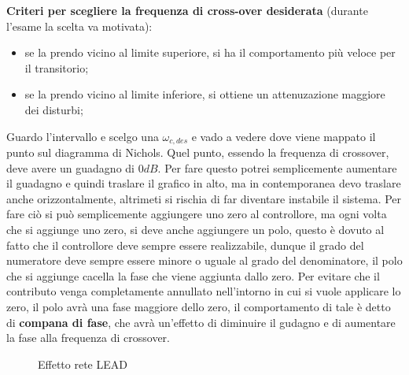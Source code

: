 \documentclass[12pt]{article}
\begin{document}
\textbf{Criteri per scegliere la frequenza di cross-over desiderata} (durante l'esame la scelta va motivata):
\begin{itemize}
    \item se la prendo vicino al limite superiore, si ha il comportamento pi\`u veloce per il transitorio;
    \item se la prendo vicino al limite inferiore, si ottiene un attenuzazione maggiore dei disturbi;
\end{itemize}


Guardo l'intervallo e scelgo una $\omega _{c,des}$ e vado a vedere dove viene mappato il punto sul diagramma di Nichols. Quel punto, essendo la frequenza di crossover, deve avere un guadagno di $0dB$. Per fare questo potrei semplicemente aumentare il guadagno e quindi traslare il grafico in alto, ma in contemporanea devo traslare anche orizzontalmente, altrimeti si rischia di far diventare instabile il sistema. Per fare ci\`o si pu\`o semplicemente aggiungere uno zero al controllore, ma ogni volta che si aggiunge uno zero, si deve anche aggiungere un polo, questo \`e dovuto al fatto che il controllore deve sempre essere realizzabile, dunque il grado del numeratore deve sempre essere minore o uguale al grado del denominatore, il polo che si aggiunge cacella la fase che viene aggiunta dallo zero. Per evitare che il contributo venga completamente annullato nell'intorno in cui si vuole applicare lo zero, il polo avr\`a una fase maggiore dello zero, il comportamento di tale \`e detto di \textbf{compana di fase}, che avr\`a un'effetto di diminuire il gudagno e di aumentare la fase alla frequenza di crossover.
\begin{figure}[H]
    \centering
    \hfill%
    \caption{Effetto rete LEAD}
\end{figure}
\end{document}
